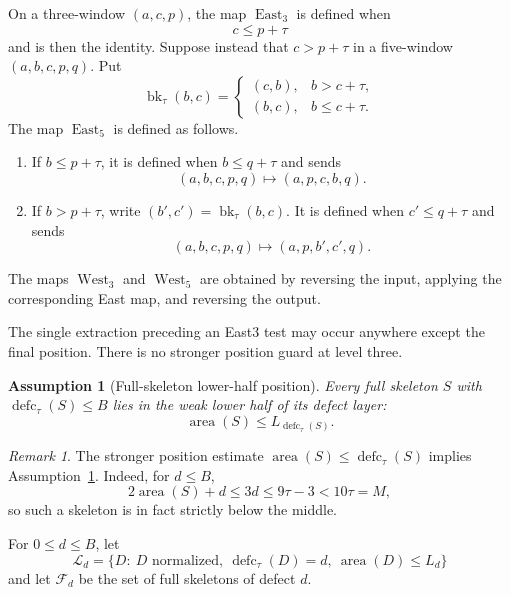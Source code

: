 \documentclass[11pt]{article}
\newtheorem{assumption}[theorem]{Assumption}
\theoremstyle{definition}
\theoremstyle{remark}
\newtheorem{remark}[theorem]{Remark}
\newcommand{\area}{\operatorname{area}}
\newcommand{\defc}{\operatorname{defc}}
\newcommand{\East}{\operatorname{East}}
\newcommand{\West}{\operatorname{West}}
\newcommand{\bk}{\operatorname{bk}}
\begin{document}
On a three-window $(a,c,p)$, the map $\East_3$ is defined when
\[
  c\le p+\tau
\]
and is then the identity.  Suppose instead that $c>p+\tau$ in a
five-window $(a,b,c,p,q)$.  Put
\[
  \bk_\tau(b,c)=
  \begin{cases}
    (c,b),&b>c+\tau,\\
    (b,c),&b\le c+\tau.
  \end{cases}
\]
The map $\East_5$ is defined as follows.
\begin{enumerate}
\item If $b\le p+\tau$, it is defined when $b\le q+\tau$ and sends
\[
  (a,b,c,p,q)\longmapsto(a,p,c,b,q).
\]
\item If $b>p+\tau$, write $(b',c')=\bk_\tau(b,c)$.  It is defined when
$c'\le q+\tau$ and sends
\[
  (a,b,c,p,q)\longmapsto(a,p,b',c',q).
\]
\end{enumerate}
The maps $\West_3$ and $\West_5$ are obtained by reversing the input,
applying the corresponding East map, and reversing the output.

The single extraction preceding an East3 test may occur anywhere except the
final position.  There is no stronger position guard at level three.

\begin{assumption}[Full-skeleton lower-half position]
\label{ass:full-lower}
Every full skeleton $S$ with $\defc_\tau(S)\le B$ lies in the weak lower half
of its defect layer:
\[
  \area(S)\le L_{\defc_\tau(S)}.
\]
\end{assumption}

\begin{remark}
The stronger position estimate $\area(S)\le\defc_\tau(S)$ implies
Assumption~\ref{ass:full-lower}.  Indeed, for $d\le B$,
\[
 2\area(S)+d\le3d\le9\tau-3<10\tau=M,
\]
so such a skeleton is in fact strictly below the middle.
\end{remark}

For $0\le d\le B$, let
\[
 \mathcal L_d
 =\{D:\ D\text{ normalized},\ \defc_\tau(D)=d,\ \area(D)\le L_d\}
\]
and let $\mathcal F_d$ be the set of full skeletons of defect $d$.
\end{document}
